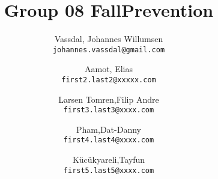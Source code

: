 \documentclass[12pt,a4paper]{report}
\title{Group 08 FallPrevention}
\author{
  Vassdal, Johannes Willumsen\\
  \texttt{johannes.vassdal@gmail.com}
  \and
  Aamot, Elias\\
  \texttt{first2.last2@xxxxx.com}
  \and
  Larsen Tomren,Filip Andre\\
  \texttt{first3.last3@xxxx.com}
    \and
  Pham,Dat-Danny\\
  \texttt{first4.last4@xxxx.com}
    \and
  K\"{u}c\"{u}kyareli,Tayfun\\
  \texttt{first5.last5@xxxx.com}
}
\begin{document}
\onehalfspacing
\maketitle
\tableofcontents








\end{document}
